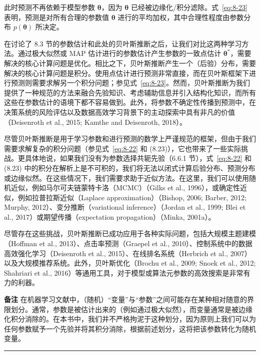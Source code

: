 此时预测不再依赖于模型参数 $ \boldsymbol{\theta} $，因为 $ \boldsymbol{\theta} $ 已经被边缘化/积分滤除。式~\eqref{eq:8-23} 表明，预测是对所有合理的参数值 $ \boldsymbol{\theta} $ 进行的平均加权，其中合理性程度由参数分布 $ p(\boldsymbol{\theta}) $ 所决定。

在讨论了 8.3 节的参数估计和此处的贝叶斯推断之后，让我们对比这两种学习方法。通过极大似然或 MAP 估计进行的参数估计产生参数的一致点估计 $ \boldsymbol{\theta}^* $，需要解决的核心计算问题是优化。相比之下，贝叶斯推断产生一个（后验）分布，需要解决的核心计算问题是积分。使用点估计进行预测非常直接，而在贝叶斯框架下进行预测则需要求解另一个积分问题；参见式~\eqref{eq:8-23}。然而，贝叶斯推断为我们提供了一种规范的方法来融合先验知识、考虑辅助信息并引入结构化知识，而所有这些在参数估计的语境下都不容易做到。此外，将参数不确定性传播到预测中，在决策系统的风险评估以及数据高效学习背景下的主动探索中具有非凡的价值（Deisenroth et al., 2015; Kamthe and Deisenroth, 2018）。

尽管贝叶斯推断是用于学习参数和进行预测的数学上严谨规范的框架，但由于我们需要求解复杂的积分问题（参见式~\eqref{eq:8-22} 和 (8.23)），它也带来了一些实际挑战。更具体地说，如果我们没有为参数选择共轭先验（6.6.1 节），式~\eqref{eq:8-22} 和 (8.23) 中的积分在解析上是不可积的，我们将无法以闭式计算后验分布、预测分布或边缘似然。在这些情况下，我们需要求助于近似方法。在这里，我们可以使用随机近似，例如马尔可夫链蒙特卡洛（MCMC）（Gilks et al., 1996），或确定性近似，例如拉普拉斯近似（Laplace approximation）（Bishop, 2006; Barber, 2012; Murphy, 2012）、变分推断（variational inference）（Jordan et al., 1999; Blei et al., 2017）或期望传播（expectation propagation）（Minka, 2001a）。

尽管存在这些挑战，贝叶斯推断已成功应用于各种实际问题，包括大规模主题建模（Hoffman et al., 2013）、点击率预测（Graepel et al., 2010）、控制系统中的数据高效强化学习（Deisenroth et al., 2015）、在线排名系统（Herbrich et al., 2007）以及大规模推荐系统。此外，贝叶斯优化（Brochu et al., 2009; Snoek et al., 2012; Shahriari et al., 2016）等通用工具，对于模型或算法元参数的高效搜索是非常有力的利器。

\begin{notebox}
\textbf{备注} 在机器学习文献中，（随机）“变量”与“参数”之间可能存在某种相对随意的界限划分。通常，参数是被估计出来的（例如通过极大似然），而变量通常是被边缘化积分消除的。在本书中，我们并不严格拘泥于这种划分，因为原则上我们可以为任何参数赋予一个先验并将其积分消除，根据前述划分，这将把该参数转化为随机变量。
\end{notebox}

\medskip\hrule\medskip

